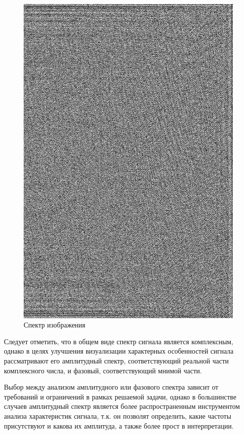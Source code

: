 \begin{figure}[!htb]
\begin{minipage}{0.5\textwidth}
		\includegraphics[scale=0.22]{assets/flowers_gray_spectrum}
		\caption{Спектр изображения}\label{flowers_full}
	\end{minipage}
\end{figure}

Следует отметить, что в общем виде спектр сигнала является комплексным, однако в целях улучшения визуализации характерных особенностей сигнала рассматривают его амплитудный спектр, соответствующий реальной части комплексного числа, и фазовый, соответствующий мнимой части.

Выбор между анализом амплитудного или фазового спектра зависит от требований и ограничений в рамках решаемой задачи, однако в большинстве случаев амплитудный спектр является более распространенным инструментом анализа характеристик сигнала, т.к. он позволят определить, какие частоты присутствуют и какова их амплитуда, а также более прост в интерпретации.

